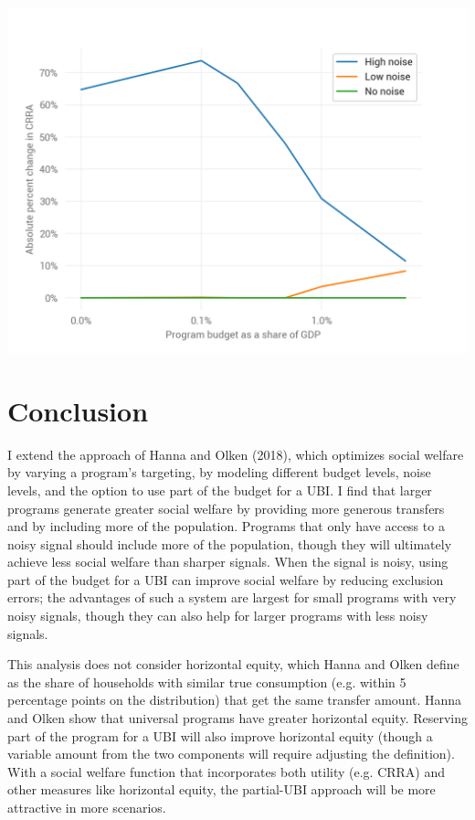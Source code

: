 \documentclass[12pt]{article}
\begin{document}
\begin{center}
	\includegraphics{improvement_from_partial_ubi}  %
	\label{fig:improvement_from_partial_ubi}
\end{center}

\section{Conclusion} \label{sec:conclusion}

I extend the approach of Hanna and Olken (2018), which optimizes social welfare 
by varying a program's targeting, by modeling different budget levels, noise 
levels, and the option to use part of the budget for a UBI. I find that larger 
programs generate greater social welfare by providing more generous transfers 
and by including more of the population. Programs that only have access to a 
noisy signal should include more of the population, though they will ultimately 
achieve less social welfare than sharper signals. When the signal is noisy, 
using part of the budget for a UBI can improve social welfare by reducing 
exclusion errors; the advantages of such a system are largest for small 
programs with very noisy signals, though they can also help for larger programs 
with less noisy signals.

This analysis does not consider horizontal equity, which Hanna and Olken define 
as the share of households with similar true consumption (e.g. within 5 
percentage points on the distribution) that get the same transfer amount. Hanna 
and Olken show that universal programs have greater horizontal equity. 
Reserving part of the program for a UBI will also improve horizontal equity 
(though a variable amount from the two components will require adjusting the 
definition). With a social welfare function that incorporates both utility 
(e.g. CRRA) and other measures like horizontal equity, the partial-UBI approach 
will be more attractive in more scenarios.



\clearpage


\end{document}
